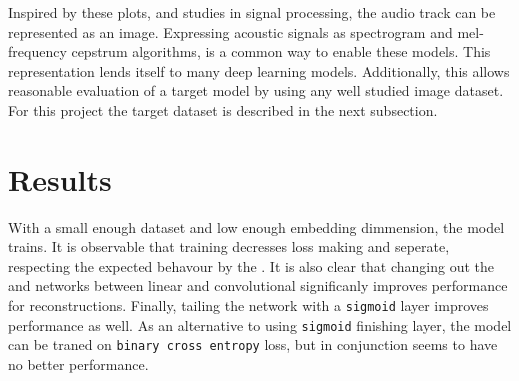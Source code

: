 \documentclass{article}
\begin{document}
\begin{multicols}{2}

Inspired by these plots, and studies in signal processing, the audio track can be represented
as an image.  Expressing acoustic signals as spectrogram and mel-frequency cepstrum algorithms,
is a common way to enable these models. This representation lends itself to many deep learning
models. Additionally, this allows reasonable evaluation of a target model by using any well
studied image dataset. For this project the target dataset is described in the next subsection.


\section{Results}

With a small enough dataset and low enough embedding dimmension, the model trains. It is observable
that training decresses loss making \tpr and \fpr seperate, respecting the expected behavour by the
\np. It is also clear that changing out the \encoder and \decoder networks between linear and
convolutional significanly improves performance for reconstructions. Finally, tailing the \decoder
network with a \texttt{sigmoid} layer improves performance as well. As an alternative to using
\texttt{sigmoid} finishing layer, the model can be traned on \texttt{binary cross entropy} loss,
but in conjunction seems to have no better performance.


\end{multicols}
\end{document}

